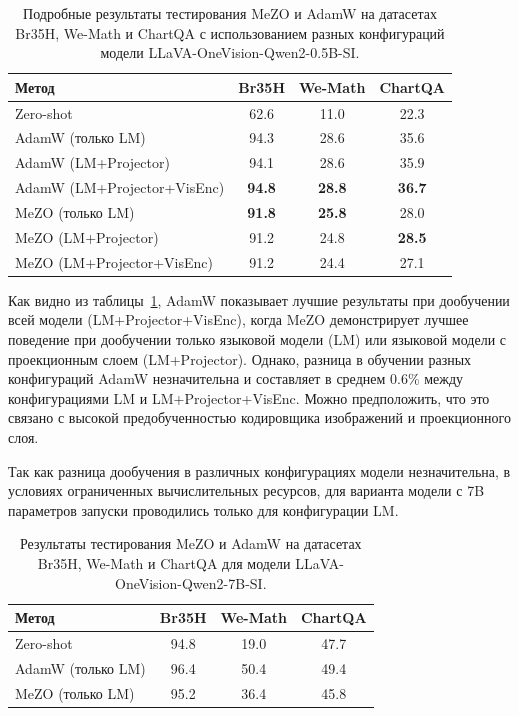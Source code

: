 \documentclass[LI,KR]{HSEUniversity}
\begin{document}
\begin{table}[H]
\centering
\begin{tabular}{|l|c|c|c|}
\hline
\textbf{Метод} & \textbf{Br35H} & \textbf{We-Math} & \textbf{ChartQA} \\ \hline
Zero-shot                         & 62.6  & 11.0  & 22.3  \\ \hline
AdamW (только LM)                   & 94.3  & 28.6  & 35.6  \\ \hline
AdamW (LM+Projector)                & 94.1  & 28.6  & 35.9  \\ \hline
AdamW (LM+Projector+VisEnc)         & \textbf{94.8}  & \textbf{28.8}  & \textbf{36.7}  \\ \hline
MeZO (только LM)                   & \textbf{91.8}  & \textbf{25.8}  & 28.0  \\ \hline
MeZO (LM+Projector)                & 91.2  & 24.8  & \textbf{28.5}  \\ \hline
MeZO (LM+Projector+VisEnc)         & 91.2  & 24.4  & 27.1  \\ \hline
\end{tabular}
\caption{Подробные результаты тестирования MeZO и AdamW на датасетах Br35H, We-Math и ChartQA с использованием разных конфигураций модели LLaVA-OneVision-Qwen2-0.5B-SI.}
\label{tab:detailed-results}
\end{table}

Как видно из таблицы~\ref{tab:detailed-results}, AdamW показывает лучшие результаты при дообучении всей модели (LM+Projector+VisEnc),
когда MeZO демонстрирует лучшее поведение при дообучении только языковой модели (LM) или языковой модели с проекционным слоем (LM+Projector).
Однако, разница в обучении разных конфигураций AdamW незначительна и составляет в среднем 0.6\% между конфигурациями LM и LM+Projector+VisEnc.
Можно предположить, что это связано с высокой предобученностью кодировщика изображений и проекционного слоя.

Так как разница дообучения в различных конфигурациях модели незначительна,
в условиях ограниченных вычислительных ресурсов,
для варианта модели с 7B параметров запуски проводились только для конфигурации LM.

\begin{table}[H]
\centering
\begin{tabular}{|l|c|c|c|}
\hline
\textbf{Метод} & \textbf{Br35H} & \textbf{We-Math} & \textbf{ChartQA} \\ \hline
Zero-shot                         & 94.8  & 19.0  & 47.7  \\ \hline
AdamW (только LM)                   & 96.4  & 50.4  & 49.4  \\ \hline
MeZO (только LM)                   & 95.2  & 36.4  & 45.8  \\ \hline
\end{tabular}
\caption{Результаты тестирования MeZO и AdamW на датасетах Br35H, We-Math и ChartQA для модели LLaVA-OneVision-Qwen2-7B-SI.}
\label{tab:detailed-results-7b}
\end{table}
\end{document}
